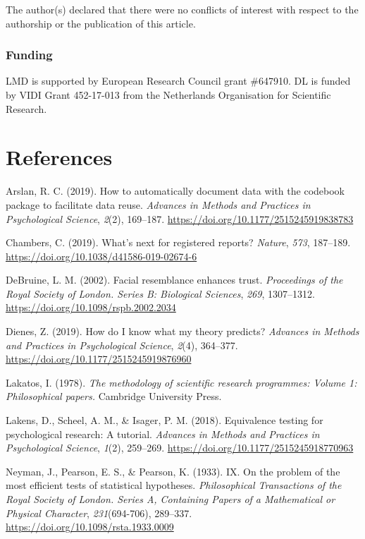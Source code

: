 \documentclass[english,doc,floatsintext]{apa6}
\begin{document}
The author(s) declared that there were no conflicts of interest with respect to the authorship or the publication of this article.

\hypertarget{funding}{%
\subsubsection{Funding}\label{funding}}

LMD is supported by European Research Council grant \#647910. DL is funded by VIDI Grant 452-17-013 from the Netherlands Organisation for Scientific Research.

\newpage

\hypertarget{references}{%
\section{References}\label{references}}

\begingroup
\setlength{\parindent}{-0.5in}
\setlength{\leftskip}{0.5in}

\hypertarget{refs}{}
\leavevmode\hypertarget{ref-arslan2019}{}%
Arslan, R. C. (2019). How to automatically document data with the codebook package to facilitate data reuse. \emph{Advances in Methods and Practices in Psychological Science}, \emph{2}(2), 169--187. \url{https://doi.org/10.1177/2515245919838783}

\leavevmode\hypertarget{ref-chambers2019}{}%
Chambers, C. (2019). What's next for registered reports? \emph{Nature}, \emph{573}, 187--189. \url{https://doi.org/10.1038/d41586-019-02674-6}

\leavevmode\hypertarget{ref-debruine2002}{}%
DeBruine, L. M. (2002). Facial resemblance enhances trust. \emph{Proceedings of the Royal Society of London. Series B: Biological Sciences}, \emph{269}, 1307--1312. \url{https://doi.org/10.1098/rspb.2002.2034}

\leavevmode\hypertarget{ref-dienes2019}{}%
Dienes, Z. (2019). How do I know what my theory predicts? \emph{Advances in Methods and Practices in Psychological Science}, \emph{2}(4), 364--377. \url{https://doi.org/10.1177/2515245919876960}

\leavevmode\hypertarget{ref-lakatos1978}{}%
Lakatos, I. (1978). \emph{The methodology of scientific research programmes: Volume 1: Philosophical papers.} Cambridge University Press.

\leavevmode\hypertarget{ref-lakens2018}{}%
Lakens, D., Scheel, A. M., \& Isager, P. M. (2018). Equivalence testing for psychological research: A tutorial. \emph{Advances in Methods and Practices in Psychological Science}, \emph{1}(2), 259--269. \url{https://doi.org/10.1177/2515245918770963}

\leavevmode\hypertarget{ref-neyman1933}{}%
Neyman, J., Pearson, E. S., \& Pearson, K. (1933). IX. On the problem of the most efficient tests of statistical hypotheses. \emph{Philosophical Transactions of the Royal Society of London. Series A, Containing Papers of a Mathematical or Physical Character}, \emph{231}(694-706), 289--337. \url{https://doi.org/10.1098/rsta.1933.0009}

\endgroup
\end{document}
